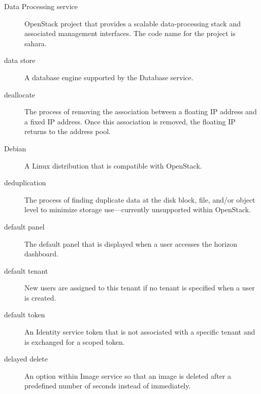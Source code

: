 \documentclass[letterpaper,10pt,english]{sphinxmanual}
\begin{document}
\begin{description}
\item[{Data Processing service}] \leavevmode{}\label{_source/glossary:term-data-processing-service}
OpenStack project that provides a scalable
data-processing stack and associated management
interfaces. The code name for the project is sahara.

\item[{data store}] \leavevmode{}\label{_source/glossary:term-data-store}
A database engine supported by the Database service.

\item[{deallocate}] \leavevmode{}\label{_source/glossary:term-deallocate}
The process of removing the association between a floating IP
address and a fixed IP address. Once this association is removed, the
floating IP returns to the address pool.

\item[{Debian}] \leavevmode{}\label{_source/glossary:term-debian}
A Linux distribution that is compatible with OpenStack.

\item[{deduplication}] \leavevmode{}\label{_source/glossary:term-deduplication}
The process of finding duplicate data at the disk block, file,
and/or object level to minimize storage use—currently unsupported
within OpenStack.

\item[{default panel}] \leavevmode{}\label{_source/glossary:term-default-panel}
The default panel that is displayed when a user accesses the
horizon dashboard.

\item[{default tenant}] \leavevmode{}\label{_source/glossary:term-default-tenant}
New users are assigned to this tenant if no tenant is specified
when a user is created.

\item[{default token}] \leavevmode{}\label{_source/glossary:term-default-token}
An Identity service token that is not associated with a specific
tenant and is exchanged for a scoped token.

\item[{delayed delete}] \leavevmode{}\label{_source/glossary:term-delayed-delete}
An option within Image service so that an image is deleted after
a predefined number of seconds instead of immediately.


\end{description}
\end{document}
